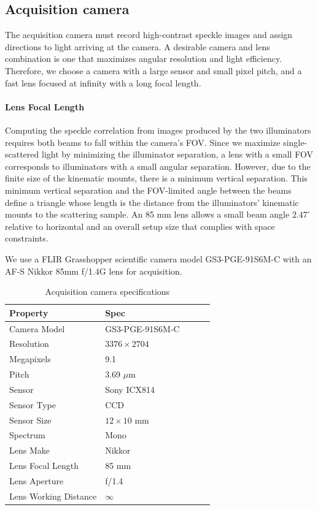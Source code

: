 \subsection{Acquisition camera}
The acquisition camera must record high-contrast speckle images and assign directions to light arriving at the camera. A desirable camera and lens combination is one that maximizes angular resolution and light efficiency. Therefore, we choose a camera with a large sensor and small pixel pitch, and a fast lens focused at infinity with a long focal length.

\paragraph{Lens Focal Length} Computing the speckle correlation from images produced by the two illuminators requires both beams to fall within the camera's FOV. Since we maximize single-scattered light by minimizing the illuminator separation, a lens with a small FOV corresponds to illuminators with a small angular separation. However, due to the finite size of the kinematic mounts, there is a minimum vertical separation. This minimum vertical separation and the FOV-limited angle between the beams define a triangle whose length is the distance from the illuminators' kinematic mounts to the scattering sample. An 85 mm lens allows a small beam angle $2.47^\circ$ relative to horizontal and an overall setup size that complies with space constraints.

We use a FLIR Grasshopper scientific camera model GS3-PGE-91S6M-C with an AF-S Nikkor 85mm f/1.4G lens for acquisition.

\begin{table}[htbp]
    \renewcommand{\arraystretch}{1.25}
    \caption{Acquisition camera specifications}
    \begin{center}
        \begin{tabular}{ l l l l l }
        \toprule[2pt]
         \textbf{Property} & \textbf{Spec} \\
         \midrule[0.75pt]
         Camera Model & GS3-PGE-91S6M-C \\
         Resolution & $3376 \times 2704$ \\
         Megapixels & 9.1 \\
         Pitch & 3.69 $\mu$m \\
         Sensor & Sony ICX814 \\
         Sensor Type & CCD \\
         Sensor Size & $12 \times 10$ mm \\
         Spectrum & Mono \\
         Lens Make & Nikkor \\
         Lens Focal Length & 85 mm \\
         Lens Aperture & f/1.4 \\
         Lens Working Distance & $\infty$ \\
         \bottomrule[2pt]
        \end{tabular}
        \label{tab:acquisition_camera}
    \end{center}
\end{table}

